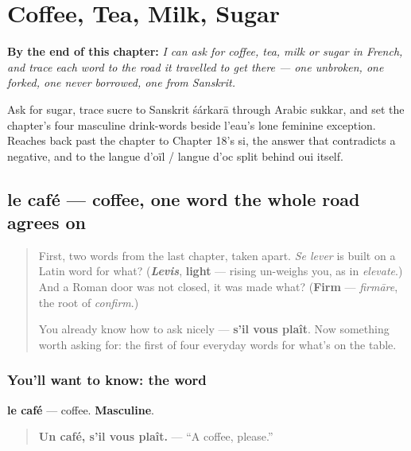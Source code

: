 
\chapter{Coffee, Tea, Milk, Sugar}
\label{ch:fr-coffee-tea-milk-sugar}

\begin{chapteropening}
\textbf{By the end of this chapter:} \emph{I can ask for coffee, tea, milk or sugar in French, and trace each word to the road it travelled to get there — one unbroken, one forked, one never borrowed, one from Sanskrit.}

Ask for sugar, trace sucre to Sanskrit śárkarā through Arabic sukkar, and set the chapter's four masculine drink-words beside l'eau's lone feminine exception. Reaches back past the chapter to Chapter 18's si, the answer that contradicts a negative, and to the langue d'oïl / langue d'oc split behind oui itself.
\end{chapteropening}

\section[le café]{le café — coffee, one word the whole road agrees on}

\label{lesson:FR-C28-cafe}



\begin{quote}
First, two words from the last chapter, taken apart. \emph{Se lever} is built on a Latin word for what? (\emph{\textbf{Levis}}, \textbf{light} — rising un-weighs you, as in \emph{elevate}.) And a Roman door was not closed, it was made what? (\textbf{Firm} — \emph{firmāre}, the root of \emph{confirm}.)

You already know how to ask nicely — \textbf{s'il vous plaît}. Now something worth asking for: the first of four everyday words for what's on the table.
\end{quote}

\subsection*{You'll want to know: the word}
\textbf{le café} — coffee. \textbf{Masculine}.

\begin{quote}
\textbf{Un café, s'il vous plaît.} — \textquotedblleft{}A coffee, please.\textquotedblright{}
\end{quote}

